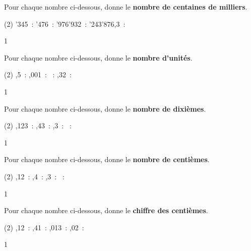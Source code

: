\documentclass[a4paper,11pt]{report}
\begin{document}
\begin{exop}{
Pour chaque nombre ci-dessous, donne le {\bf nombre de centaines de milliers}.
\begin{tasks}[before-skip=-0.7em](2)
'345~: \hrulefill
{}'476~: \hrulefill
{}'976'932~: \hrulefill
{}'243'876,3~: \hrulefill
\end{tasks}
}{1}\end{exop}
\begin{exop}{
Pour chaque nombre ci-dessous, donne le {\bf nombre d'unités}.
\begin{tasks}[before-skip=-0.7em](2)
,5~: \hrulefill
{},001~: \hrulefill
{}~: \hrulefill
{},32~: \hrulefill
\end{tasks}
}{1}\end{exop}
\begin{exop}{
Pour chaque nombre ci-dessous, donne le {\bf nombre de dixièmes}.
\begin{tasks}[before-skip=-0.7em](2)
,123~: \hrulefill
{},43~: \hrulefill
{},3~: \hrulefill
{}~: \hrulefill
\end{tasks}
}{1}\end{exop}

\begin{exop}{
Pour chaque nombre ci-dessous, donne le {\bf nombre de centièmes}.
\begin{tasks}[before-skip=-0.7em](2)
,12~: \hrulefill
{},4~: \hrulefill
{},3~: \hrulefill
{}~: \hrulefill
\end{tasks}

}{1}\end{exop}

\begin{exop}{
Pour chaque nombre ci-dessous, donne le {\bf chiffre des centièmes}.
\begin{tasks}[before-skip=-0.7em](2)
,12~: \hrulefill
{},41~: \hrulefill
{},013~: \hrulefill
{},02~: \hrulefill
\end{tasks}


}{1}\end{exop}
\end{document}
